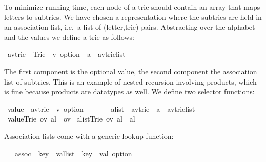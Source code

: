 %
\begin{isabellebody}%
\def\isabellecontext{Trie}%
%
\begin{isamarkuptext}%
To minimize running time, each node of a trie should contain an array that maps
letters to subtries. We have chosen a
representation where the subtries are held in an association list, i.e.\ a
list of (letter,trie) pairs.  Abstracting over the alphabet  and the
values  we define a trie as follows:%
\end{isamarkuptext}%
\ {\isacharparenleft}{\isacharprime}a{\isacharcomma}{\isacharprime}v{\isacharparenright}trie\ {\isacharequal}\ Trie\ \ {\isachardoublequote}{\isacharprime}v\ option{\isachardoublequote}\ \ {\isachardoublequote}{\isacharparenleft}{\isacharprime}a\ {\isacharasterisk}\ {\isacharparenleft}{\isacharprime}a{\isacharcomma}{\isacharprime}v{\isacharparenright}trie{\isacharparenright}list{\isachardoublequote}%
\begin{isamarkuptext}%
\noindent
The first component is the optional value, the second component the
association list of subtries.  This is an example of nested recursion involving products,
which is fine because products are datatypes as well.
We define two selector functions:%
\end{isamarkuptext}%
\ value\ {\isacharcolon}{\isacharcolon}\ {\isachardoublequote}{\isacharparenleft}{\isacharprime}a{\isacharcomma}{\isacharprime}v{\isacharparenright}trie\ {\isasymRightarrow}\ {\isacharprime}v\ option{\isachardoublequote}\isanewline
\ \ \ \ \ \ \ alist\ {\isacharcolon}{\isacharcolon}\ {\isachardoublequote}{\isacharparenleft}{\isacharprime}a{\isacharcomma}{\isacharprime}v{\isacharparenright}trie\ {\isasymRightarrow}\ {\isacharparenleft}{\isacharprime}a\ {\isacharasterisk}\ {\isacharparenleft}{\isacharprime}a{\isacharcomma}{\isacharprime}v{\isacharparenright}trie{\isacharparenright}list{\isachardoublequote}\isanewline
{}\ {\isachardoublequote}value{\isacharparenleft}Trie\ ov\ al{\isacharparenright}\ {\isacharequal}\ ov{\isachardoublequote}\isanewline
{}\ {\isachardoublequote}alist{\isacharparenleft}Trie\ ov\ al{\isacharparenright}\ {\isacharequal}\ al{\isachardoublequote}%
\begin{isamarkuptext}%
\noindent
Association lists come with a generic lookup function:%
\end{isamarkuptext}%
\ \ \ assoc\ {\isacharcolon}{\isacharcolon}\ {\isachardoublequote}{\isacharparenleft}{\isacharprime}key\ {\isacharasterisk}\ {\isacharprime}val{\isacharparenright}list\ {\isasymRightarrow}\ {\isacharprime}key\ {\isasymRightarrow}\ {\isacharprime}val\ option{\isachardoublequote}\isanewline

\end{isabellebody}
